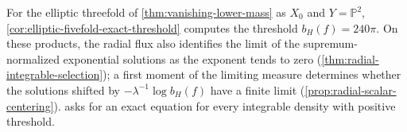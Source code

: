 For the elliptic threefold of \cref{thm:vanishing-lower-mass} as $X_0$ and $Y=\mathbb P^2$, \cref{cor:elliptic-fivefold-exact-threshold} computes the threshold $b_H(f)=240\pi$. On these products, the radial flux also identifies the limit of the supremum-normalized exponential solutions as the exponent tends to zero (\cref{thm:radial-integrable-selection}); a first moment of the limiting measure determines whether the solutions shifted by $-\lambda^{-1}\log b_H(f)$ have a finite limit (\cref{prop:radial-scalar-centering}).  asks for an exact equation for every integrable density with positive threshold.


